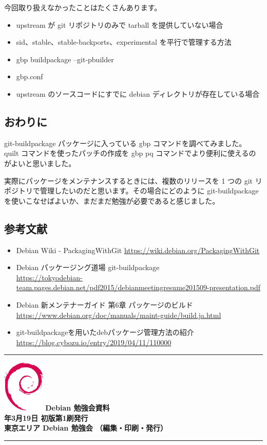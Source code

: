 \documentclass[mingoth,a4paper]{jsarticle}
\newcommand{\debmtgyear}{2022}
\newcommand{\debmtgmonth}{3}
\newcommand{\debmtgdate}{19}
\begin{document}
今回取り扱えなかったことはたくさんあります。

\begin{itemize}
  \item upstream が git リポジトリのみで tarball を提供していない場合
  \item sid、stable、stable-backports、experimental を平行で管理する方法
  \item gbp buildpackage --git-pbuilder
  \item gbp.conf
  \item upstream のソースコードにすでに debian ディレクトリが存在している場合
\end{itemize}


\subsection{おわりに}

git-buildpackage パッケージに入っている gbp コマンドを調べてみました。
quilt コマンドを使ったパッチの作成を gbp pq コマンドでより便利に使えるのがよいと思いました。

実際にパッケージをメンテナンスするときには、複数のリリースを 1 つの git リポジトリで管理したいのだと思います。その場合にどのように git-buildpackage を使いこなせばよいか、まだまだ勉強が必要であると感じました。


\subsection{参考文献}

\begin{itemize}
  \item Debian Wiki - PackagingWithGit \url{https://wiki.debian.org/PackagingWithGit}
  \item Debian パッケージング道場 git-buildpackage\\ \url{https://tokyodebian-team.pages.debian.net/pdf2015/debianmeetingresume201509-presentation.pdf}
  \item Debian 新メンテナーガイド 第6章 パッケージのビルド \\ \url{https://www.debian.org/doc/manuals/maint-guide/build.ja.html}
  \item git-buildpackageを用いたdebパッケージ管理方法の紹介 \\ \url{https://blog.cybozu.io/entry/2019/04/11/110000}
\end{itemize}

\mbox{}\newpage
\mbox{}\newpage
\mbox{}\newpage

\vspace*{15cm}
\hrule
\vspace{2mm}
\includegraphics[width=2cm]{image-assets/openlogo-nd.eps}
\noindent \Large \bf Debian 勉強会資料\\
\noindent \normalfont \debmtgyear{}年\debmtgmonth{}月\debmtgdate{}日 \hspace{5mm}  初版第1刷発行\\
\noindent \normalfont 東京エリア Debian 勉強会 （編集・印刷・発行）\\
\hrule
\end{document}
